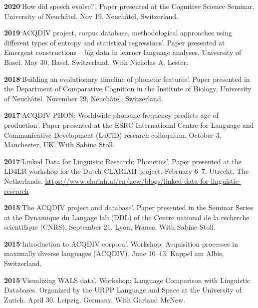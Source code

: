 \documentclass[11pt]{article}
\newcommand{\hangpara}{
 \setlength{\parindent}{0in} %
 \hangindent=0.42in %
}
\begin{document}
\vskip 6pt
\hangpara
{\bf 2020}\hspace{1ex}`How did speech evolve?'. Paper presented at the Cognitive Science Seminar, University of Neuchâtel. Nov 19, Neuchâtel, Switzerland.

\vskip 6pt
\hangpara
{\bf 2019}\hspace{1ex}`ACQDIV project, corpus database, methodological approaches using different types of entropy and statistical regressions'. Paper presented at Emergent constructions -- big data in learner language analyses, University of Basel. May 30, Basel, Switzerland. With Nicholas A. Lester.

\vskip 6pt
\hangpara
{\bf 2018}\hspace{1ex}`Building an evolutionary timeline of phonetic features'. Paper presented in the Department of Comparative Cognition in the Institute of Biology, University of Neuchâtel. November 29, Neuchâtel, Switzerland.

\vskip 6pt
\hangpara
{\bf 2017}\hspace{1ex}`ACQDIV PHON: Worldwide phoneme frequency predicts age of production'. Paper presented at the ESRC International Centre for Language and Communicative Development (LuCiD) research colloquium. October 3, Manchester, UK. With Sabine Stoll.

\vskip 6pt
\hangpara
{\bf 2017}\hspace{1ex}`Linked Data for Linguistic Research: Phonetics'. Paper presented at the LD4LR workshop for the Dutch CLARIAH project. February 6--7. Utrecht, The Netherlands. \url{https://www.clariah.nl/en/new/blogs/linked-data-for-linguistic-research}

\vskip 6pt
\hangpara
{\bf 2015}\hspace{1ex}`The ACQDIV project and database'. Paper presented in the Seminar Series at the Dynamique du Langage lab (DDL) of the Centre national de la recherche scientifique (CNRS). September 21. Lyon, France. With Sabine Stoll.

\vskip 6pt
\hangpara
{\bf 2015}\hspace{1ex}`Introduction to ACQDIV corpora'. Workshop: Acquisition processes in maximally diverse languages (ACQDIV). June 10--13. Kappel am Albis, Switzerland.

\vskip 6pt
\hangpara
{\bf 2015}\hspace{1ex}`Visualizing WALS data'. Workshop: Language Comparison with Linguistic Databases. Organized by the URPP Language and Space at the University of Zurich. April 30. Leipzig, Germany. With Garland McNew.
\end{document}
